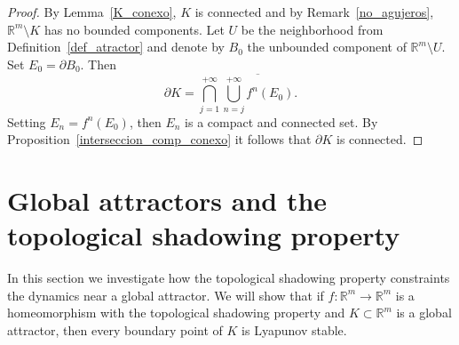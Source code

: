 \documentclass{amsart}
\newtheorem{teo}{Theorem}
\newcommand{\R}{{\mathbb{R}}}
\begin{document}
	\begin{proof}
		By Lemma~\ref{K_conexo}, $K$ is connected  and by Remark~\ref{no_agujeros}, $\R^m\setminus K$ has no bounded components.  
		Let $U$ be the neighborhood from Definition~\ref{def_atractor} and denote by $B_0$ the unbounded component of $\R^m\setminus U$. Set $E_0=\partial B_0$. Then
		\[
		\partial K=\bigcap_{j=1}^{+\infty} \overline{\bigcup_{n=j}^{+\infty} f^n(E_0)}.
		\]
		Setting  $E_n=f^n(E_0)$, then $E_n$ is  a compact and connected set. By Proposition~\ref{interseccion_comp_conexo} it follows that $\partial K$ is connected.
	\end{proof}
	
	
	
	
	
	
	
	
	
	
	
	
	\section{Global attractors and the topological shadowing property}\label{at_trivial}
	
	In this section we investigate how the topological shadowing property constraints the dynamics near a global attractor.  
	We will show that if $f:\R^m\to \R^m$ is a homeomorphism with the topological shadowing property and $K\subset \R^m$ is a global attractor, then every boundary point of $K$ is Lyapunov stable.  
	
\end{document}
